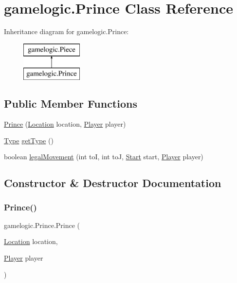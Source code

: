 \hypertarget{classgamelogic_1_1_prince}{}\section{gamelogic.\+Prince Class Reference}
\label{classgamelogic_1_1_prince}
Inheritance diagram for gamelogic.\+Prince\+:\begin{figure}[H]
\begin{center}
\leavevmode
\includegraphics[height=2.000000cm]{classgamelogic_1_1_prince}
\end{center}
\end{figure}
\subsection*{Public Member Functions}
\begin{DoxyCompactItemize}
\item 
\mbox{\hyperlink{classgamelogic_1_1_prince_a7f45f9e01612930edfdaeb05a4f49f60}{Prince}} (\mbox{\hyperlink{classgamelogic_1_1_location}{Location}} location, \mbox{\hyperlink{classgamelogic_1_1_player}{Player}} player)
\item 
\mbox{\hyperlink{enumgamelogic_1_1_type}{Type}} \mbox{\hyperlink{classgamelogic_1_1_prince_aeb9994d7627fc4ff2e17844fefde51e3}{get\+Type}} ()
\item 
boolean \mbox{\hyperlink{classgamelogic_1_1_prince_a52427dfdfb25376c2435ada360e3a14c}{legal\+Movement}} (int toI, int toJ, \mbox{\hyperlink{classgamelogic_1_1_start}{Start}} start, \mbox{\hyperlink{classgamelogic_1_1_player}{Player}} player)
\end{DoxyCompactItemize}


\subsection{Constructor \& Destructor Documentation}
\mbox{\label{classgamelogic_1_1_prince_a7f45f9e01612930edfdaeb05a4f49f60}} 
\subsubsection{\texorpdfstring{Prince()}{Prince()}}
{\footnotesize\ttfamily gamelogic.\+Prince.\+Prince (\begin{DoxyParamCaption}\item[{\mbox{\hyperlink{classgamelogic_1_1_location}{Location}}}]{location,  }\item[{\mbox{\hyperlink{classgamelogic_1_1_player}{Player}}}]{player }\end{DoxyParamCaption})}

